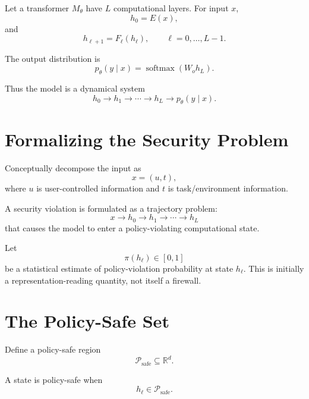 \documentclass[11pt]{article}
\newcommand{\R}{\mathbb{R}}
\newcommand{\Psafe}{\mathcal{P}_{\mathrm{safe}}}
\begin{document}
Let a transformer $M_\theta$ have $L$ computational layers. For input $x$,
\begin{equation}
h_0=E(x),
\end{equation}
and
\begin{equation}
h_{\ell+1}=F_\ell(h_\ell),\qquad \ell=0,\ldots,L-1.
\end{equation}

The output distribution is
\begin{equation}
p_\theta(y\mid x)=\operatorname{softmax}(W_oh_L).
\end{equation}

Thus the model is a dynamical system
\begin{equation}
h_0\rightarrow h_1\rightarrow\cdots\rightarrow h_L
\rightarrow p_\theta(y\mid x).
\end{equation}

\section{Formalizing the Security Problem}

Conceptually decompose the input as
\begin{equation}
x=(u,t),
\end{equation}
where $u$ is user-controlled information and $t$ is task/environment
information.

A security violation is formulated as a trajectory problem:
\begin{equation}
x\rightarrow h_0\rightarrow h_1\rightarrow\cdots\rightarrow h_L
\end{equation}
that causes the model to enter a policy-violating computational state.

Let
\begin{equation}
\pi(h_\ell)\in[0,1]
\end{equation}
be a statistical estimate of policy-violation probability at state
$h_\ell$. This is initially a representation-reading quantity, not itself a
firewall.

\section{The Policy-Safe Set}

Define a policy-safe region
\begin{equation}
\Psafe\subseteq\R^d.
\end{equation}

A state is policy-safe when
\begin{equation}
h_\ell\in\Psafe.
\end{equation}
\end{document}
